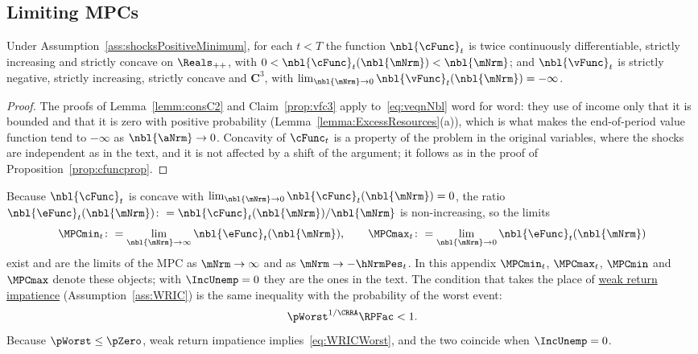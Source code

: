 \documentclass[\econtexRoot/BufferStockTheory]{subfiles}
\begin{document}
\subsection{Limiting MPCs}\label{subsec:PositiveMinimumMPC}

\begin{proposition}\label{prop:cfuncpropPositiveMinimum}
Under Assumption~\ref{ass:shocksPositiveMinimum}, for each $t<T$ the function $\nbl{\cFunc}_{t}$ is twice continuously differentiable, strictly increasing and strictly concave on $\Reals_{++}$, with $0<\nbl{\cFunc}_{t}(\nbl{\mNrm})<\nbl{\mNrm}$; and $\nbl{\vFunc}_{t}$ is strictly negative, strictly increasing, strictly concave and $\mathbf{C}^{3}$, with $\lim_{\nbl{\mNrm}\rightarrow 0}\nbl{\vFunc}_{t}(\nbl{\mNrm})=-\infty$.
\end{proposition}

\begin{proof}
The proofs of Lemma~\ref{lemm:consC2} and Claim~\ref{prop:vfc3} apply to~\eqref{eq:veqnNbl} word for word: they use of income only that it is bounded and that it is zero with positive probability (Lemma~\ref{lemma:ExcessResources}(a)), which is what makes the end-of-period value function tend to $-\infty$ as $\nbl{\aNrm}\rightarrow 0$.
Concavity of $\cFunc_{t}$ is a property of the problem in the original variables, where the shocks are independent as in the text, and it is not affected by a shift of the argument; it follows as in the proof of Proposition~\ref{prop:cfuncprop}.
\end{proof}

Because $\nbl{\cFunc}_{t}$ is concave with $\lim_{\nbl{\mNrm}\rightarrow 0}\nbl{\cFunc}_{t}(\nbl{\mNrm})=0$, the ratio $\nbl{\eFunc}_{t}(\nbl{\mNrm})\colon=\nbl{\cFunc}_{t}(\nbl{\mNrm})/\nbl{\mNrm}$ is non-increasing, so the limits
\begin{equation*}
  \MPCmin_{t}\colon=\lim_{\nbl{\mNrm}\rightarrow\infty}\nbl{\eFunc}_{t}(\nbl{\mNrm}),\qquad \MPCmax_{t}\colon=\lim_{\nbl{\mNrm}\rightarrow 0}\nbl{\eFunc}_{t}(\nbl{\mNrm})
\end{equation*}
exist and are the limits of the MPC as $\mNrm\rightarrow\infty$ and as $\mNrm\rightarrow-\hNrmPes_{t}$.
In this appendix $\MPCmin_{t}$, $\MPCmax_{t}$, $\MPCmin$ and $\MPCmax$ denote these objects; with $\IncUnemp=0$ they are the ones in the text.
The condition that takes the place of \hyperlink{WRIC}{weak return impatience} (Assumption~\ref{ass:WRIC}) is the same inequality with the probability of the worst event:
\begin{equation}\label{eq:WRICWorst}
  \pWorst^{1/\CRRA}\RPFac<1 .
\end{equation}
Because $\pWorst\leq\pZero$, weak return impatience implies~\eqref{eq:WRICWorst}, and the two coincide when $\IncUnemp=0$.
\end{document}
